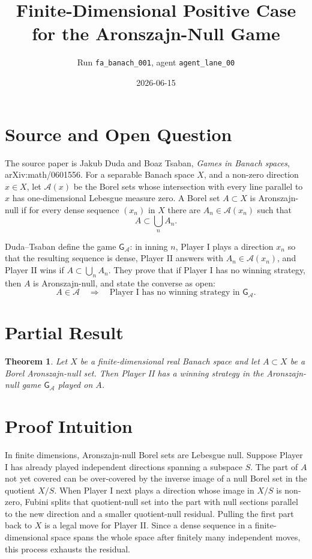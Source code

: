 \documentclass[11pt]{article}
\title{Finite-Dimensional Positive Case for the Aronszajn-Null Game}
\author{Run \texttt{fa\_banach\_001}, agent \texttt{agent\_lane\_00}}
\date{2026-06-15}
\newtheorem{theorem}{Theorem}
\newcommand{\G}{\mathsf{G}_{\mathcal A}}
\begin{document}
\maketitle

\section*{Source and Open Question}

The source paper is Jakub Duda and Boaz Tsaban, \emph{Games in Banach spaces},
arXiv:math/0601556.  For a separable Banach space \(X\), and a non-zero
direction \(x\in X\), let \(\mathcal A(x)\) be the Borel sets whose
intersection with every line parallel to \(x\) has one-dimensional Lebesgue
measure zero.  A Borel set \(A\subset X\) is Aronszajn-null if for every dense
sequence \((x_n)\) in \(X\) there are \(A_n\in\mathcal A(x_n)\) such that
\[
A\subset \bigcup_n A_n.
\]

Duda--Tsaban define the game \(\G\): in inning \(n\), Player I plays a direction
\(x_n\) so that the resulting sequence is dense, Player II answers with
\(A_n\in\mathcal A(x_n)\), and Player II wins if \(A\subset\bigcup_n A_n\).
They prove that if Player I has no winning strategy, then \(A\) is
Aronszajn-null, and state the converse as open:
\[
A\in\mathcal A \quad\Longrightarrow\quad \text{Player I has no winning
strategy in }\G.
\]

\section*{Partial Result}

\begin{theorem}
Let \(X\) be a finite-dimensional real Banach space and let \(A\subset X\) be a
Borel Aronszajn-null set. Then Player II has a winning strategy in the
Aronszajn-null game \(\G\) played on \(A\).
\end{theorem}

\section*{Proof Intuition}

In finite dimensions, Aronszajn-null Borel sets are Lebesgue null. Suppose
Player I has already played independent directions spanning a subspace \(S\).
The part of \(A\) not yet covered can be over-covered by the inverse image of a
null Borel set in the quotient \(X/S\). When Player I next plays a direction
whose image in \(X/S\) is non-zero, Fubini splits that quotient-null set into
the part with null sections parallel to the new direction and a smaller
quotient-null residual. Pulling the first part back to \(X\) is a legal move
for Player II. Since a dense sequence in a finite-dimensional space spans the
whole space after finitely many independent moves, this process exhausts the
residual.
\end{document}
